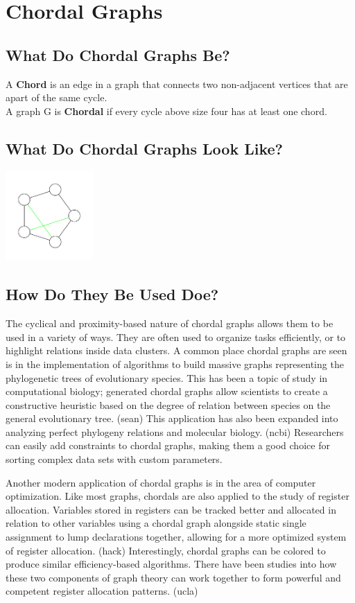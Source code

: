\chapter{Chordal Graphs}
\section{What Do Chordal Graphs Be?}
A \textbf{Chord} is an edge in a graph that connects two non-adjacent vertices that are apart of the same cycle.\\
A graph G is \textbf{Chordal} if every cycle above size four has at least one chord.\\

\section{What Do Chordal Graphs Look Like?}
\includegraphics[width=0.25\textwidth]{chordalGraph.pdf}

\section{How Do They Be Used Doe?}
The cyclical and proximity-based nature of chordal graphs allows them to be used in a variety of ways. They are often used to organize
tasks efficiently, or to highlight relations inside data clusters. A common place chordal graphs are seen is in the implementation of algorithms to build
massive graphs representing the phylogenetic trees of evolutionary species. This has been a topic of study in computational biology; generated chordal
graphs allow scientists to create a constructive heuristic based on the degree of relation between species on the general evolutionary tree. (sean) This
application has also been expanded into analyzing perfect phylogeny relations and molecular biology. (ncbi) Researchers can easily add constraints to
chordal graphs, making them a good choice for sorting complex data sets with custom parameters.\par
Another modern application of chordal graphs is in the area of computer optimization. Like most graphs, chordals are also applied to the study of
register allocation. Variables stored in registers can be tracked better and allocated in relation to other variables using a chordal graph alongside
static single assignment to lump declarations together, allowing for a more optimized system of register allocation. (hack) Interestingly, chordal graphs
can be colored to produce similar efficiency-based algorithms. There have been studies into how these two components of graph theory can work together to
form powerful and competent register allocation patterns. (ucla)\\

